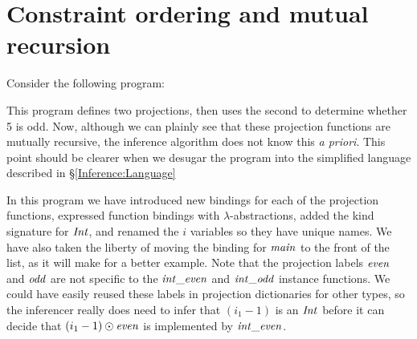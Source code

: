 
\clearpage{}
\section{Constraint ordering and mutual recursion}
\label{inference:ordering}

Consider the following program:


This program defines two projections, then uses the second to determine whether 5 is odd. Now, although we can plainly see that these projection functions are mutually recursive, the inference algorithm does not know this \emph{a priori}. This point should be clearer when we desugar the program into the simplified language described in \S\ref{Inference:Language}



\vspace{-1em}
\code{
	$\klet$ & $\imain$	& $= \lambda x. \ \kcase \ x \ \kof \iUnit \to \iprint \ 5 \odot \iodd$ \\

		& $\iintEven$	& $= \lambda i_1. \ \kif \ i_1 == 0 \ 
						\kthen \ \iTrue  \ 
						\kelse \ (i_1 - 1) \odot \iodd$ \\
		& $\iintOdd$	& $= \lambda i_2. \ \kif \ i_2 == 0 \ 
						\kthen \ \iFalse \ 
						\kelse \ (i_2 - 1) \odot \ieven$ \\
	$\kin$ 	& \dots
}

In this program we have introduced new bindings for each of the projection functions, expressed function bindings with $\lambda$-abstractions, added the kind signature for $\operatorname{\mathit{Int}}$, and renamed the $i$ variables so they have unique names. We have also taken the liberty of moving the binding for $\imain$ to the front of the list, as it will make for a better example. Note that the projection labels $\operatorname{\mathit{even}}$ and $\operatorname{\mathit{odd}}$ are not specific to the $\iintEven$ and $\iintOdd$ instance functions. We could have easily reused these labels in projection dictionaries for other types, so the inferencer really does need to infer that $(i_1 - 1)$ is an $\operatorname{\mathit{Int}}$ before it can decide that $(i_1 - 1) \odot \operatorname{\mathit{even}}$ is implemented by $\iintEven$. 

